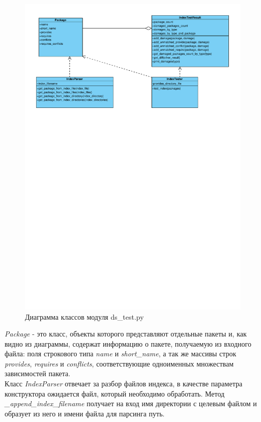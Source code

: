 \begin{figure}[!ht]
\begin{center}
\includegraphics[scale=0.8, trim=10mm 180mm 10mm 0mm, clip]{../resources/uml/ds_test_class_diagram.pdf}
\caption{Диаграмма классов модуля ds\_test.py}
\label{gr:dstestclassdiag}
\end{center}
\end{figure}

\textit{Package} - это класс, объекты которого представляют отдельные пакеты и, как видно из диаграммы,
содержат информацию о пакете, получаемую из входного файла: поля строкового типа \textit{name} и 
\textit{short\_name}, а так же массивы строк \textit{provides}, \textit{requires}
и \textit{conflicts}, соответствующие одноименных множествам зависимостей пакета.
\\

Класс \textit{IndexParser} отвечает за разбор файлов индекса, в качестве параметра конструктора
ожидается файл, который необходимо обработать. Метод \textit{\_append\_index\_filename} получает на вход
имя директории с целевым файлом и образует из него и имени файла для парсинга
путь.

